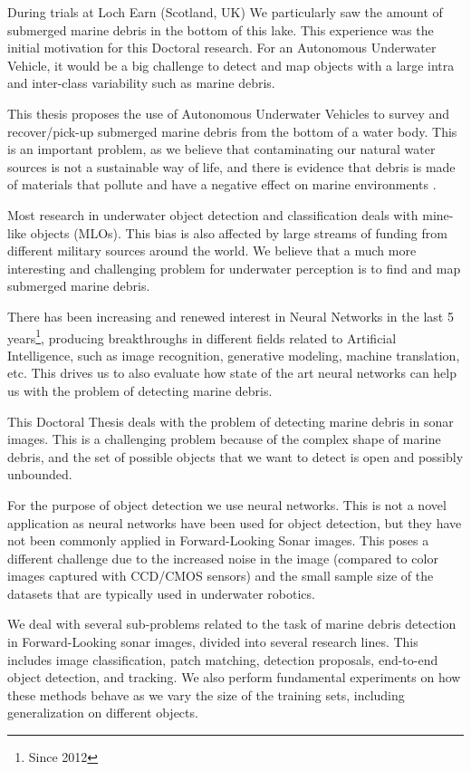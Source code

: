 During trials at Loch Earn (Scotland, UK) We particularly saw the amount of submerged marine debris in the bottom of this lake. This experience was the initial motivation for this Doctoral research. For an Autonomous Underwater Vehicle, it would be a big challenge to detect and map objects with a large intra and inter-class variability such as marine debris.

This thesis proposes the use of Autonomous Underwater Vehicles to survey and recover/pick-up submerged marine debris from the bottom of a water body. This is an important problem, as we believe that contaminating our natural water sources is not a sustainable way of life, and there is evidence \cite[1em]{iniguez2016marine} that debris is made of materials that pollute and have a negative effect on marine environments \cite[1em]{sheavly2007marine}.

Most research in underwater object detection and classification deals with mine-like objects (MLOs). This bias is also affected by large streams of funding from different military sources around the world. We believe that a much more interesting and challenging problem for underwater perception is to find and map submerged marine debris.

There has been increasing and renewed interest in Neural Networks in the last 5 years\footnote{Since 2012}, producing breakthroughs in different fields related to Artificial Intelligence, such as image recognition, generative modeling, machine translation, etc. This drives us to also evaluate how state of the art neural networks can help us with the problem of detecting marine debris.

This Doctoral Thesis deals with the problem of detecting marine debris in sonar images. This is a challenging problem because of the complex shape of marine debris, and the set of possible objects that we want to detect is open and possibly unbounded.

For the purpose of object detection we use neural networks. This is not a novel application as neural networks have been used for object detection, but they have not been commonly applied in Forward-Looking Sonar images. This poses a different challenge due to the increased noise in the image (compared to color images captured with CCD/CMOS sensors) and the small sample size of the datasets that are typically used in underwater robotics.

We deal with several sub-problems related to the task of marine debris detection in Forward-Looking sonar images, divided into several research lines. This includes image classification, patch matching, detection proposals, end-to-end object detection, and tracking. We also perform fundamental experiments on how these methods behave as we vary the size of the training sets, including generalization on different objects.

